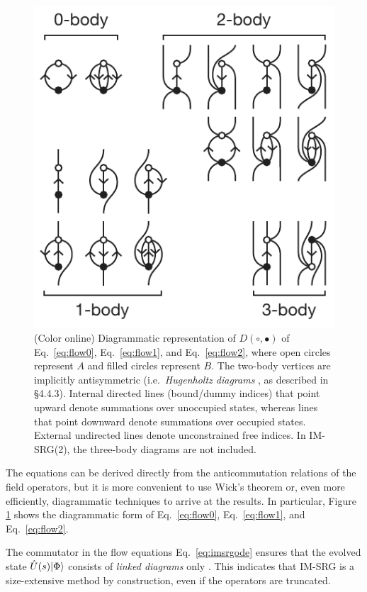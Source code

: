 \begin{figure}
\includegraphics{fig-diagrams-imsrg.pdf}
\caption{(Color online) Diagrammatic representation of $D(\circ, \bullet)$ of Eq.\ \eqref{eq:flow0}, Eq.\ \eqref{eq:flow1}, and Eq.\ \eqref{eq:flow2}, where open circles represent $A$ and filled circles represent $B$.  The two-body vertices are implicitly antisymmetric (i.e.\ \textit{Hugenholtz diagrams} \cite{HUGENHOLTZ1957481}, as described in \cite{shavitt2009many} \S 4.4.3).  Internal directed lines (bound/dummy indices) that point upward denote summations over unoccupied states, whereas lines that point downward denote summations over occupied states.  External undirected lines denote unconstrained free indices.  In IM-SRG(2), the three-body diagrams are not included.}
\label{fig:diagrams-imsrg}
\end{figure}

The equations can be derived directly from the anticommutation relations of the field operators, but it is more convenient to use Wick's theorem \cite{PhysRev.80.268} or, even more efficiently, diagrammatic techniques \cite{shavitt2009many} to arrive at the results.  In particular, Figure \ref{fig:diagrams-imsrg} shows the diagrammatic form of Eq.\ \eqref{eq:flow0}, Eq.\ \eqref{eq:flow1}, and Eq.\ \eqref{eq:flow2}.

The commutator in the flow equations Eq.\ \eqref{eq:imsrgode} ensures that the evolved state $\hat U(s) | \Phi \rangle$ consists of \emph{linked diagrams} only \cite{shavitt2009many}.  This indicates that IM-SRG is a size-extensive \cite{ISI:A1981MN73700014} method by construction, even if the operators are truncated.

